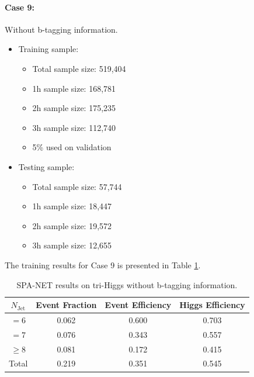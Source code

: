 \documentclass[12pt]{article}
\begin{document}
		\paragraph{Case 9:} Without b-tagging information.
		\begin{itemize}
			\item Training sample:
			\begin{itemize}
				\item Total sample size: 519,404
				\item 1h sample size: 168,781
				\item 2h sample size: 175,235
				\item 3h sample size: 112,740
				\item 5\% used on validation
			\end{itemize}
			\item Testing sample: 
				\begin{itemize}
					\item Total sample size: 57,744
					\item 1h sample size: 18,447
					\item 2h sample size: 19,572
					\item 3h sample size: 12,655
				\end{itemize}
		\end{itemize}
		The training results for Case 9 is presented in Table \ref{tab:SPANet_triHiggs_no_btag}.
		\begin{table}[htpb]
			\centering
			\caption{SPA-NET results on tri-Higgs without b-tagging information.}
			\label{tab:SPANet_triHiggs_no_btag}
			\begin{tabular}{c|c|cc}
				$N_\text{Jet}$ & Event Fraction & Event Efficiency & Higgs Efficiency \\
				\hline
				$=6$	  &   0.062             &    0.600              &    0.703             \\
				$=7$	  &   0.076             &    0.343              &    0.557             \\
				$\ge 8$	  &   0.081             &    0.172              &    0.415             \\
				Total	  &   0.219             &    0.351              &    0.545             \\
			\end{tabular}
		\end{table}
\end{document}
